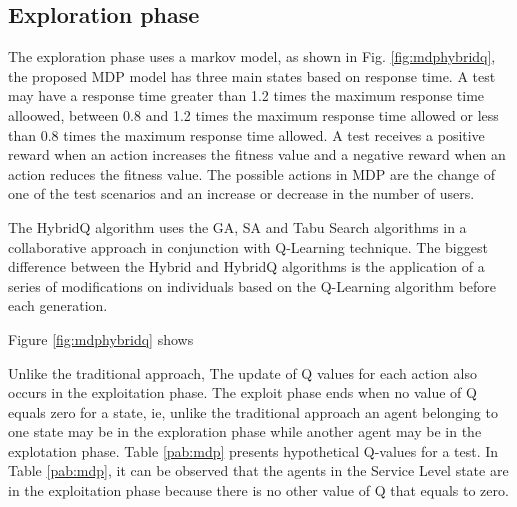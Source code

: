 \documentclass{bmcart}
\begin{document}
\subsection{Exploration phase}

The exploration phase uses a markov model, as shown in Fig. \ref{fig:mdphybridq}, the proposed MDP model  has three main states based on response time. A test may have a response time greater than 1.2 times the maximum response time alloowed, between 0.8 and 1.2 times the maximum response time allowed or less than 0.8 times the maximum response time allowed. A test receives a positive reward when an action increases the fitness value and a negative reward when an action reduces the fitness value. The possible actions in MDP are the change of one of the test scenarios and an increase or decrease in the number of users.


The HybridQ algorithm uses the GA, SA and Tabu Search algorithms in a collaborative approach in conjunction with Q-Learning technique. The biggest difference between the Hybrid and HybridQ algorithms is the application of a series of modifications on individuals based on the Q-Learning algorithm before each generation.

Figure \ref{fig:mdphybridq} shows 


Unlike the traditional approach, The update of Q values for each action also occurs in the exploitation phase. The exploit phase ends when no value of Q equals zero for a state, ie, unlike the traditional approach an agent belonging to one state may be in the exploration phase while another agent may be in the explotation phase. Table \ref{pab:mdp} presents hypothetical Q-values for a test. In Table \ref{pab:mdp}, it can be observed that the agents in the Service Level state are in the exploitation phase because there is no other value of Q that equals to zero.
\end{document}
